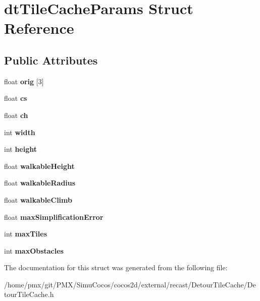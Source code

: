\hypertarget{structdtTileCacheParams}{}\section{dt\+Tile\+Cache\+Params Struct Reference}
\label{structdtTileCacheParams}
\subsection*{Public Attributes}
\begin{DoxyCompactItemize}
\item 
\mbox{\label{structdtTileCacheParams_a3e319ef88a0b2c91cdcc82126946b8b9}} 
float {\bfseries orig} \mbox{[}3\mbox{]}
\item 
\mbox{\label{structdtTileCacheParams_aa3d397344d70e8d65300ceec47bf6512}} 
float {\bfseries cs}
\item 
\mbox{\label{structdtTileCacheParams_a366560e2dd03f2d8a2ceaf9b08cc7578}} 
float {\bfseries ch}
\item 
\mbox{\label{structdtTileCacheParams_a0028aaae0c422f2191be3f5f44a06c02}} 
int {\bfseries width}
\item 
\mbox{\label{structdtTileCacheParams_a0428fa48e2d01e17aab08ff814b2c769}} 
int {\bfseries height}
\item 
\mbox{\label{structdtTileCacheParams_ab9a8b82edf527b2396f778a8b4121f88}} 
float {\bfseries walkable\+Height}
\item 
\mbox{\label{structdtTileCacheParams_ae2c266df6a6a9feb25c3ab7d6aff2616}} 
float {\bfseries walkable\+Radius}
\item 
\mbox{\label{structdtTileCacheParams_a9d83b6704bebc30682a1f2e97d09d1fc}} 
float {\bfseries walkable\+Climb}
\item 
\mbox{\label{structdtTileCacheParams_a426e4e8fbaea199ecc4714ba01aa8ef2}} 
float {\bfseries max\+Simplification\+Error}
\item 
\mbox{\label{structdtTileCacheParams_a08e5fc995595846369e9dc040370b660}} 
int {\bfseries max\+Tiles}
\item 
\mbox{\label{structdtTileCacheParams_a30fb34944589db46ad6262748d3f4c0c}} 
int {\bfseries max\+Obstacles}
\end{DoxyCompactItemize}


The documentation for this struct was generated from the following file\+:\begin{DoxyCompactItemize}
\item 
/home/pmx/git/\+P\+M\+X/\+Simu\+Cocos/cocos2d/external/recast/\+Detour\+Tile\+Cache/Detour\+Tile\+Cache.\+h\end{DoxyCompactItemize}
